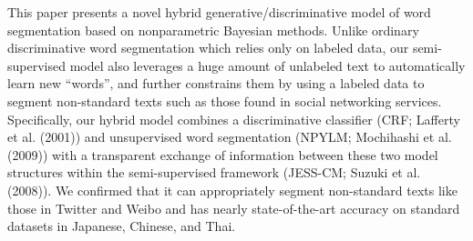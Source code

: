 This paper presents a novel hybrid generative/discriminative model of word segmentation based on nonparametric Bayesian methods. Unlike ordinary discriminative word segmentation which relies only on labeled data, our semi-supervised model also leverages a huge amount of unlabeled text to automatically learn new ``words'', and further constrains them by using a labeled data to segment non-standard texts such as those found in social networking services. Specifically, our hybrid model combines a discriminative classifier (CRF; Lafferty et al. (2001)) and unsupervised word segmentation (NPYLM; Mochihashi et al. (2009)) with a transparent exchange of information between these two model structures within the semi-supervised framework (JESS-CM; Suzuki et al. (2008)). We confirmed that it can appropriately segment non-standard texts like those in Twitter and Weibo and has nearly state-of-the-art accuracy on standard datasets in Japanese, Chinese, and Thai.
